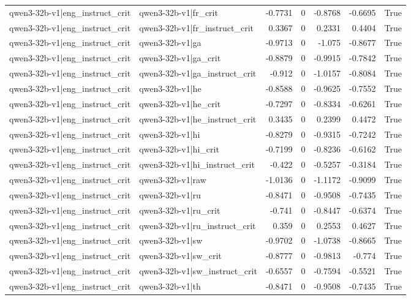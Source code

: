 \begin{table}
\begin{tabular}{l l r r r r l}
qwen3-32b-v1|eng_instruct_crit & qwen3-32b-v1|fr_crit & -0.7731 & 0 & -0.8768 & -0.6695 & True \\
qwen3-32b-v1|eng_instruct_crit & qwen3-32b-v1|fr_instruct_crit & 0.3367 & 0 & 0.2331 & 0.4404 & True \\
qwen3-32b-v1|eng_instruct_crit & qwen3-32b-v1|ga & -0.9713 & 0 & -1.075 & -0.8677 & True \\
qwen3-32b-v1|eng_instruct_crit & qwen3-32b-v1|ga_crit & -0.8879 & 0 & -0.9915 & -0.7842 & True \\
qwen3-32b-v1|eng_instruct_crit & qwen3-32b-v1|ga_instruct_crit & -0.912 & 0 & -1.0157 & -0.8084 & True \\
qwen3-32b-v1|eng_instruct_crit & qwen3-32b-v1|he & -0.8588 & 0 & -0.9625 & -0.7552 & True \\
qwen3-32b-v1|eng_instruct_crit & qwen3-32b-v1|he_crit & -0.7297 & 0 & -0.8334 & -0.6261 & True \\
qwen3-32b-v1|eng_instruct_crit & qwen3-32b-v1|he_instruct_crit & 0.3435 & 0 & 0.2399 & 0.4472 & True \\
qwen3-32b-v1|eng_instruct_crit & qwen3-32b-v1|hi & -0.8279 & 0 & -0.9315 & -0.7242 & True \\
qwen3-32b-v1|eng_instruct_crit & qwen3-32b-v1|hi_crit & -0.7199 & 0 & -0.8236 & -0.6162 & True \\
qwen3-32b-v1|eng_instruct_crit & qwen3-32b-v1|hi_instruct_crit & -0.422 & 0 & -0.5257 & -0.3184 & True \\
qwen3-32b-v1|eng_instruct_crit & qwen3-32b-v1|raw & -1.0136 & 0 & -1.1172 & -0.9099 & True \\
qwen3-32b-v1|eng_instruct_crit & qwen3-32b-v1|ru & -0.8471 & 0 & -0.9508 & -0.7435 & True \\
qwen3-32b-v1|eng_instruct_crit & qwen3-32b-v1|ru_crit & -0.741 & 0 & -0.8447 & -0.6374 & True \\
qwen3-32b-v1|eng_instruct_crit & qwen3-32b-v1|ru_instruct_crit & 0.359 & 0 & 0.2553 & 0.4627 & True \\
qwen3-32b-v1|eng_instruct_crit & qwen3-32b-v1|sw & -0.9702 & 0 & -1.0738 & -0.8665 & True \\
qwen3-32b-v1|eng_instruct_crit & qwen3-32b-v1|sw_crit & -0.8777 & 0 & -0.9813 & -0.774 & True \\
qwen3-32b-v1|eng_instruct_crit & qwen3-32b-v1|sw_instruct_crit & -0.6557 & 0 & -0.7594 & -0.5521 & True \\
qwen3-32b-v1|eng_instruct_crit & qwen3-32b-v1|th & -0.8471 & 0 & -0.9508 & -0.7435 & True \\

\end{tabular}
\end{table}
